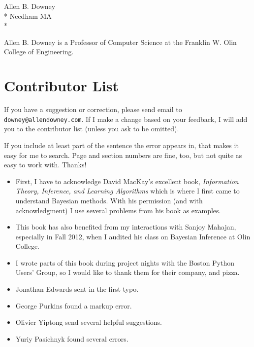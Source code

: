 \documentclass[12pt]{book}
\begin{document}
Allen B. Downey \\*
Needham MA \\*

Allen B. Downey is a Professor of Computer Science at 
the Franklin W. Olin College of Engineering.







\section*{Contributor List}

If you have a suggestion or correction, please send email to 
{\tt downey@allendowney.com}.  If I make a change based on your
feedback, I will add you to the contributor list
(unless you ask to be omitted).

If you include at least part of the sentence the
error appears in, that makes it easy for me to search.  Page and
section numbers are fine, too, but not quite as easy to work with.
Thanks!

\small

\begin{itemize}

\item First, I have to acknowledge David MacKay's excellent book,
  {\it Information Theory, Inference, and Learning Algorithms} which is
  where I first came to understand Bayesian methods.  With his
  permission (and with acknowledgment) I use several problems from
  his book as examples.

\item This book has also benefited from my interactions with Sanjoy
  Mahajan, especially in Fall 2012, when I audited his class on
  Bayesian Inference at Olin College.

\item I wrote parts of this book during project nights with the
Boston Python Users' Group, so I would like to thank them for their
company, and pizza.

\item Jonathan Edwards sent in the first typo.

\item George Purkins found a markup error.

\item Olivier Yiptong send several helpful suggestions.

\item Yuriy Pasichnyk found several errors.


\end{itemize}
\end{document}
